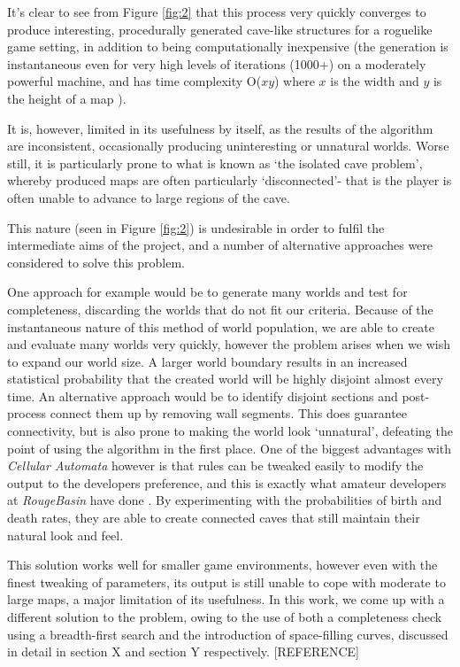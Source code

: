 \documentclass[12pt,a4paper]{article}
\begin{document}
It's clear to see from Figure \ref{fig:2} that this process very quickly converges to produce interesting, procedurally generated cave-like structures for a roguelike game setting, in addition to being computationally inexpensive (the generation is instantaneous even for very high levels of iterations (1000+) on a moderately powerful machine, and has time complexity O($xy$) where $x$ is the width and $y$ is the height of a map \cite{cellularcomplexity}). 

It is, however, limited in its usefulness by itself, as the results of the algorithm are inconsistent, occasionally producing uninteresting or unnatural worlds. Worse still, it is particularly prone to what is known as `the isolated cave problem', whereby produced maps are often particularly `disconnected'- that is the player is often unable to advance to large regions of the cave. 

This nature (seen in Figure \ref{fig:2}) is undesirable in order to fulfil the intermediate aims of the project, and a number of alternative approaches were considered to solve this problem.

One approach for example would be to generate many worlds and test for completeness, discarding the worlds that do not fit our criteria. Because of the instantaneous nature of this method of world population, we are able to create and evaluate many worlds very quickly, however the problem arises when we wish to expand our world size. A larger world boundary results in an increased statistical probability that the created world will be highly disjoint almost every time. An alternative approach would be to identify disjoint sections and post-process connect them up by removing wall segments. This does guarantee connectivity, but is also prone to making the world look `unnatural', defeating the point of using the algorithm in the first place. One of the biggest advantages with \emph{Cellular Automata} however is that rules can be tweaked easily to modify the output to the developers preference, and this is exactly what amateur developers at \emph{RougeBasin} have done \cite{roguebasin}. By experimenting with the probabilities of birth and death rates, they are able to create connected caves that still maintain their natural look and feel.

This solution works well for smaller game environments, however even with the finest tweaking of parameters, its output is still unable to cope with moderate to large maps, a major limitation of its usefulness. In this work, we come up with a different solution to the problem, owing to the use of both a completeness check using a breadth-first search and the introduction of space-filling curves, discussed in detail in section X and section Y respectively.  [REFERENCE]
\end{document}

